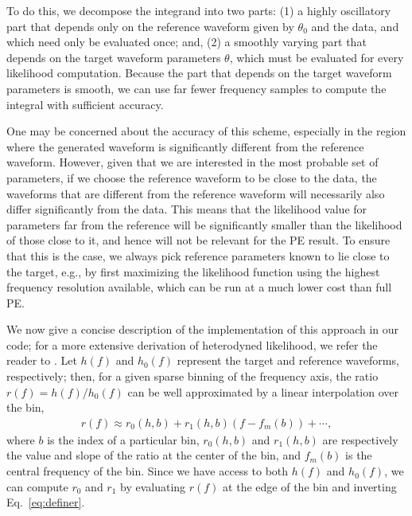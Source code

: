 \documentclass[twocolumn]{aastex631}
\begin{document}
To do this, we decompose the integrand into two parts: (1) a highly oscillatory
part that depends only on the reference waveform given by $\theta_0$ and
the data, and which need only be evaluated once; and, (2) a smoothly
varying part that depends on the target waveform parameters $\theta$, which
must be evaluated for every likelihood computation. Because the part
that depends on the target waveform parameters is smooth, we can use far fewer
frequency samples to compute the integral with sufficient accuracy.

One may be concerned about the accuracy of this scheme, especially in the
region where the generated waveform is significantly different from the
reference waveform. However, given that we are interested in the most probable
set of parameters, if we choose the reference waveform to be close to the data,
the waveforms that are different from the reference waveform will necessarily
also differ significantly from the data. This means that the likelihood value
for parameters far from the reference will be significantly smaller than the
likelihood of those close to it, and hence will not be relevant for the PE
result. To ensure that this is the case, we always pick reference parameters
known to lie close to the target, e.g., by first maximizing the likelihood
function using the highest frequency resolution available, which can be run at
a much lower cost than full PE. 

We now give a concise description of the implementation of this approach in our
code; for a more extensive derivation of heterodyned likelihood, we refer the
reader to \cite{Zackay:2018qdy}. Let $h(f)$ and $h_0(f)$
represent the target and reference waveforms, respectively; then, for a given
sparse binning of the frequency axis, the ratio $r(f) = h(f)/h_0(f)$ can be
well approximated by a linear interpolation over the bin,
\begin{align}
r(f) \approx r_0(h,b) + r_1(h,b)(f- f_m(b)) + \cdots,
\label{eq:definer}
\end{align}
where $b$ is the index of a particular bin, $r_0(h,b)$ and $r_1(h,b)$ are
respectively the value and slope of the ratio at the center of the bin, and
$f_m(b)$ is the central frequency of the bin. Since we have access to both
$h(f)$ and $h_0(f)$, we can compute $r_0$ and $r_1$ by evaluating $r(f)$ at the
edge of the bin and inverting Eq.~\eqref{eq:definer}.
\end{document}
